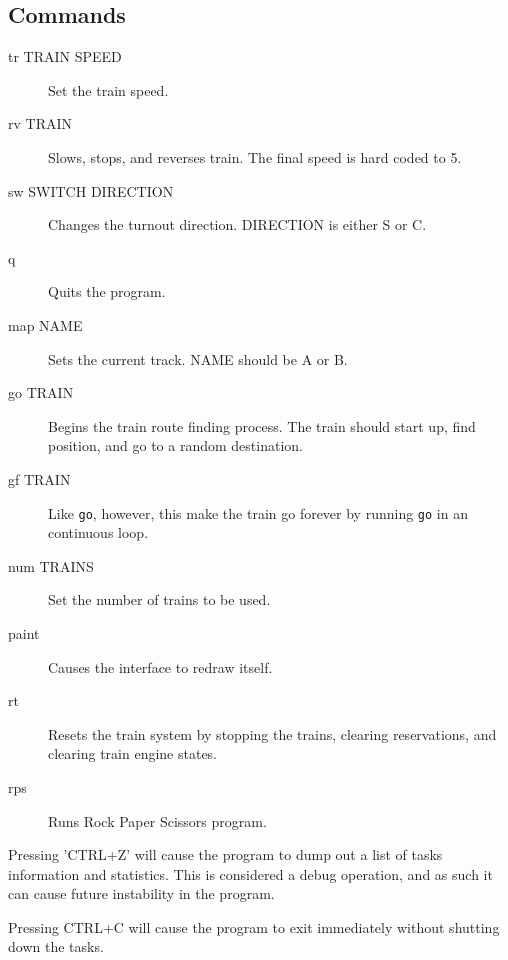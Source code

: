 \documentclass[letterpaper]{article}
\begin{document}
\subsection{Commands%
  \label{commands}%
}
%
\begin{description}
\item[{tr TRAIN SPEED}] \leavevmode 
Set the train speed.

\item[{rv TRAIN}] \leavevmode 
Slows, stops, and reverses train. The final speed is hard coded to 5.

\item[{sw SWITCH DIRECTION}] \leavevmode 
Changes the turnout direction. DIRECTION is either S or C.

\item[{q}] \leavevmode 
Quits the program.

\item[{map NAME}] \leavevmode 
Sets the current track. NAME should be A or B.

\item[{go TRAIN}] \leavevmode 
Begins the train route finding process. The train should start up, find position, and go to a random destination.

\item[{gf TRAIN}] \leavevmode 
Like \texttt{go}, however, this make the train go forever by running \texttt{go} in an continuous loop.

\item[{num TRAINS}] \leavevmode 
Set the number of trains to be used.

\item[{paint}] \leavevmode 
Causes the interface to redraw itself.

\item[{rt}] \leavevmode 
Resets the train system by stopping the trains, clearing reservations, and clearing train engine states.

\item[{rps}] \leavevmode 
Runs Rock Paper Scissors program.

\end{description}

Pressing 'CTRL+Z' will cause the program to dump out a list of tasks information and statistics.   This is considered a debug operation, and as such it can cause future instability in the program.

Pressing CTRL+C will cause the program to exit immediately without shutting down the tasks.
\end{document}
